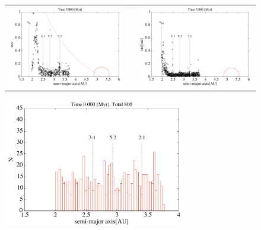 \documentclass[11pt,a4paper,oneside,onecolumn]{jreport}
\begin{document}
\begin{figure}[H]
\begin{tabular}{ccc}
\begin{minipage}[t]{0.45\hsize}
\centering
\includegraphics[width=8cm]{./image/asteroid_ecc_5Myr.pdf}
\end{minipage} &
\begin{minipage}[t]{0.1\hsize}
\end{minipage} &
\begin{minipage}[t]{0.45\hsize}
\centering
\includegraphics[width=8cm]{./image/asteroid_inc_5Myr.pdf}
\end{minipage}\\
%
\end{tabular}
\caption{\label{fig:asteroid_ecc_inc_5Myr}}
\end{figure}






\begin{figure}[H]
\centering
\includegraphics[width=8cm]{./image/asteroid_histogram_0yr.pdf}
\caption{\label{}}
\end{figure}
\end{document}
